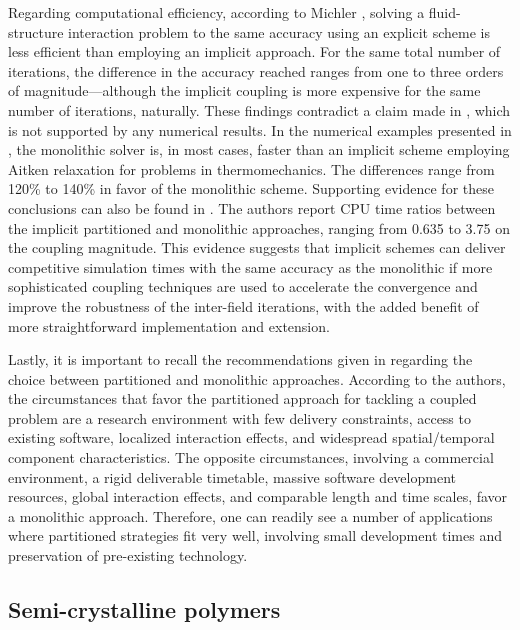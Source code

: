 Regarding computational efficiency, according to Michler \citep{michler_efficient_2005}, solving a fluid-structure interaction problem to the same accuracy using an explicit scheme is less efficient than employing an implicit approach.
For the same total number of iterations, the difference in the accuracy reached ranges from one to three orders of magnitude---although the implicit coupling is more expensive for the same number of iterations, naturally.
These findings contradict a claim made in \cite{felippa_partitioned_2001}, which is not supported by any numerical results.
In the numerical examples presented in \cite{danowski_computational_2014}, the monolithic solver is, in most cases, faster than an implicit scheme employing Aitken relaxation for problems in thermomechanics.
The differences range from 120\% to 140\% in favor of the monolithic scheme.
Supporting evidence for these conclusions can also be found in \cite{novascone_evaluation_2015}.
The authors report  CPU time ratios between the implicit partitioned and monolithic approaches, ranging from 0.635 to 3.75 on the coupling magnitude.
This evidence suggests that implicit schemes can deliver competitive simulation times with the same accuracy as the monolithic if more sophisticated coupling techniques are used to accelerate the convergence and improve the robustness of the inter-field iterations, with the added benefit of more straightforward implementation and extension.

Lastly, it is important to recall the recommendations given in \cite{felippa_partitioned_2001} regarding the choice between partitioned and monolithic approaches.
According to the authors, the circumstances that favor the partitioned approach for tackling a coupled problem are a research environment with few delivery constraints, access to existing software, localized interaction effects, and widespread spatial/temporal component characteristics.
The opposite circumstances, involving a commercial environment, a rigid deliverable timetable, massive software development resources, global interaction effects, and comparable length and time scales, favor a monolithic approach.
Therefore, one can readily see a number of applications where partitioned strategies fit very well, involving small development times and preservation of pre-existing technology.

\subsection{Semi-crystalline polymers}

